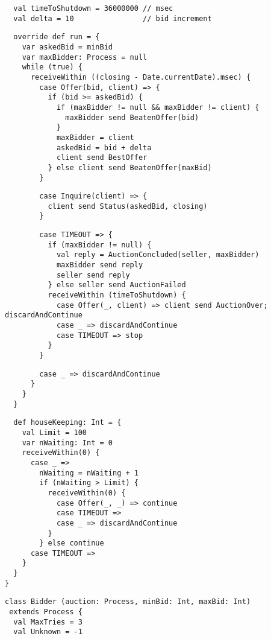 {{\begin{lstlisting}
  val timeToShutdown = 36000000 // msec
  val delta = 10                // bid increment
\end{lstlisting}
\begin{lstlisting}
  override def run = {
    var askedBid = minBid
    var maxBidder: Process = null
    while (true) {
      receiveWithin ((closing - Date.currentDate).msec) {
        case Offer(bid, client) => {
          if (bid >= askedBid) {
            if (maxBidder != null && maxBidder != client) {
              maxBidder send BeatenOffer(bid)
            }
            maxBidder = client
            askedBid = bid + delta
            client send BestOffer
          } else client send BeatenOffer(maxBid)
        }
\end{lstlisting}
\begin{lstlisting}
        case Inquire(client) => {
          client send Status(askedBid, closing)
        }
\end{lstlisting}
\begin{lstlisting}
        case TIMEOUT => {
          if (maxBidder != null) {
            val reply = AuctionConcluded(seller, maxBidder)
            maxBidder send reply
            seller send reply
          } else seller send AuctionFailed
          receiveWithin (timeToShutdown) {
            case Offer(_, client) => client send AuctionOver; discardAndContinue
            case _ => discardAndContinue
            case TIMEOUT => stop
          }
        }
\end{lstlisting}
\begin{lstlisting}
        case _ => discardAndContinue
      }
    }
  }
\end{lstlisting}
\begin{lstlisting}
  def houseKeeping: Int = {
    val Limit = 100
    var nWaiting: Int = 0
    receiveWithin(0) {
      case _ =>
        nWaiting = nWaiting + 1
        if (nWaiting > Limit) {
          receiveWithin(0) {
            case Offer(_, _) => continue
            case TIMEOUT =>
            case _ => discardAndContinue
          }
        } else continue
      case TIMEOUT =>
    }
  }
}
\end{lstlisting}
\begin{lstlisting}
class Bidder (auction: Process, minBid: Int, maxBid: Int)
 extends Process {
  val MaxTries = 3
  val Unknown = -1


\end{lstlisting}}}
